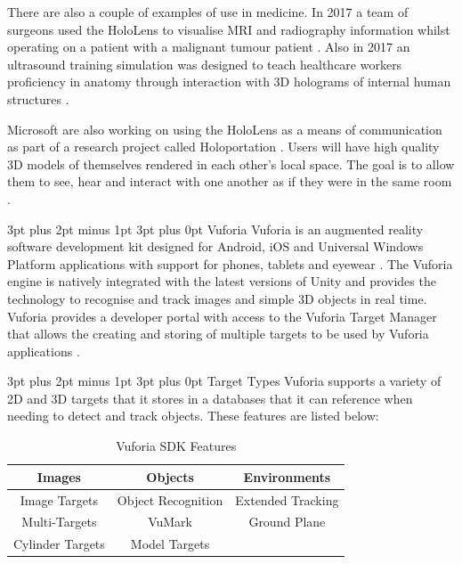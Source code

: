 \documentclass[12pt,a4paper]{article}
\makeatletter
\renewcommand\subsubsection{\@startsection {subsubsection}{1}{0mm} %
	                           {3pt plus 2pt minus 1pt} %
	                           {3pt plus 0pt} %
	                           {\normalfont\bfseries}}
\renewcommand\subsection{\@startsection {subsection}{1}{0mm} %
                               {3pt plus 2pt minus 1pt} %
                               {3pt plus 0pt} %
                               {\large\bfseries}}
\makeatother
\begin{document}
There are also a couple of examples of use in medicine. In 2017 a team of surgeons used the HoloLens to visualise MRI and radiography information whilst operating on a patient with a malignant tumour patient \cite{bernardo17, 3ders17}. Also in 2017 an ultrasound training simulation was designed to teach healthcare workers proficiency in anatomy through interaction with 3D holograms of internal human structures \cite{lynn17, mahmood17}.

Microsoft are also working on using the HoloLens as a means of communication as part of a research project called Holoportation \cite{cutler17}. Users will have high quality 3D models of themselves rendered in each other's local space. The goal is to allow them to see, hear and interact with one another as if they were in the same room \cite{orts16}.

\subsection{Vuforia}
Vuforia is an augmented reality software development kit designed for Android, iOS and Universal Windows Platform applications with support for phones, tablets and eyewear \cite{vuforia, vuforiaeyewear}. The Vuforia engine is natively integrated with the latest versions of Unity and provides the technology to recognise and track images and simple 3D objects in real time. Vuforia provides a developer portal with access to the Vuforia Target Manager that allows the creating and storing of multiple targets to be used by Vuforia applications \cite{vuforiatargetmanager}.

\subsubsection{Target Types}
Vuforia supports a variety of 2D and 3D targets that it stores in a databases that it can reference when needing to detect and track objects. These features are listed below:

\begin{table}[!h]
	\renewcommand{\arraystretch}{1.3}
	\caption{Vuforia SDK Features}
	\label{hardware}
	\centering
	\begin{tabular}{c|c|c}
		\toprule
		Images & Objects & Environments \\ \midrule
		Image Targets & Object Recognition & Extended Tracking \\
		Multi-Targets & VuMark & Ground Plane \\
		Cylinder Targets & Model Targets &  \\ \bottomrule
	\end{tabular}
\end{table}
\end{document}
